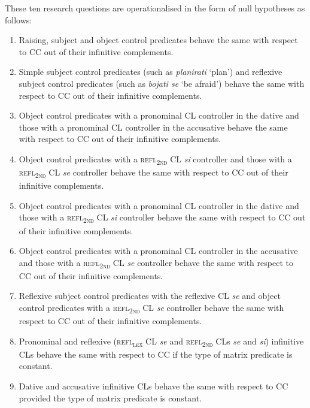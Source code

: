 \noindent These ten research questions are operationalised in the form of null hypotheses as follows:
\begin{enumerate}[label=H\textsubscript{0.\arabic*}:,ref=H\textsubscript{0.\arabic*}]\sloppy
\item\label{H1} Raising, subject and object control predicates behave the same with respect to CC out of their infinitive complements.
\item\label{H2} Simple subject control predicates (such as \textit{planirati} ‘plan’) and reflexive subject control predicates (such as \textit{bojati se} ‘be afraid’) behave the same with respect to CC out of their infinitive complements.
\item\label{H3} Object control predicates with a pronominal CL controller in the dative and those with a pronominal CL controller in the accusative behave the same with respect to CC out of their infinitive complements.
\item\label{H4} Object control predicates with a \textsc{refl\textsubscript{2nd}} CL \textit{si} controller and those with a \textsc{refl\textsubscript{2nd}} CL \textit{se} controller behave the same with respect to CC out of their infinitive complements.
\item\label{H5} Object control predicates with a pronominal CL controller in the dative and those with a \textsc{refl\textsubscript{2nd}} CL \textit{si} controller behave the same with respect to CC out of their infinitive complements.
\item\label{H6} Object control predicates with a pronominal CL controller in the accusative and those with a \textsc{refl\textsubscript{2nd}} CL \textit{se} controller behave the same with respect to CC out of their infinitive complements.
\item\label{H7} Reflexive subject control predicates with the reflexive CL \textit{se} and object control predicates with a \textsc{refl\textsubscript{2nd}} CL \textit{se} controller behave the same with respect to CC out of their infinitive complements.
\item\label{H8} Pronominal and reflexive (\textsc{refl\textsubscript{\textsc{lex}}} CL \textit{se} and \textsc{refl\textsubscript{2nd}} CLs \textit{se} and \textit{si}) infinitive CLs behave the same with respect to CC if the type of matrix predicate is constant.
\item\label{H9} Dative and accusative infinitive CLs behave the same with respect to CC provided the type of matrix predicate is constant.
\end{enumerate}

